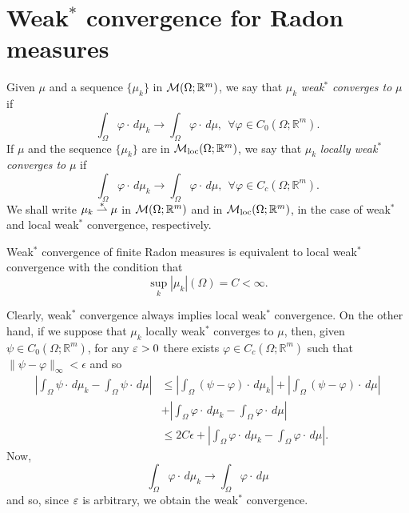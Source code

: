 \section{Weak$^{*}$ convergence for Radon measures}

\begin{definition} Given $\mu$ and a sequence $\{\mu_{k}\}$ in $\mathcal{M}(\Omega; \mathbb{R}^{m})$, we say that $\mu_{k}$ {\em weak$^{*}$ converges to} $\mu$ if
\[ \int_{\Omega} \varphi \cdot \, d\mu_{k} \to \int_{\Omega} \varphi \cdot \, d\mu, \    \   \forall \varphi \in C_{0}(\Omega; \mathbb{R}^{m}).   \]
If $\mu$ and the sequence $\{\mu_{k}\}$ are in $\mathcal{M}_{\rm loc}(\Omega; \mathbb{R}^{m})$, we say that $\mu_{k}$ {\em locally weak$^{*}$ converges to} $\mu$ if
\[ \int_{\Omega} \varphi \cdot \, d\mu_{k} \to \int_{\Omega} \varphi \cdot \, d\mu, \    \   \forall \varphi \in C_{c}(\Omega; \mathbb{R}^{m}).   \]
We shall write $\mu_{k} \overset{*}{\rightharpoonup} \mu$ in $\mathcal{M}(\Omega; \mathbb{R}^{m})$ and in $\mathcal{M}_{\rm loc}(\Omega; \mathbb{R}^{m})$, in the case of weak$^{*}$ and local weak$^{*}$ convergence, respectively.
\end{definition}

\begin{remark} \label{equivalenceweak-star} Weak$^{*}$ convergence of finite Radon measures is equivalent to local weak$^{*}$ convergence with the condition that $$\sup_{k} |\mu_{k}|(\Omega) = C < \infty.$$

Clearly, weak$^{*}$ convergence always implies local weak$^{*}$ convergence. 
On the other hand, if we suppose that $\mu_{k}$ locally weak$^{*}$ converges to $\mu$, then, given $\psi \in C_{0}(\Omega; \mathbb{R}^{m})$, for any $\varepsilon > 0$ there exists $\varphi \in C_{c}(\Omega; \mathbb{R}^{m})$ such that $\|\psi - \varphi\|_{\infty} < \epsilon$ and so
\begin{align*} \left | \int_{\Omega} \psi \cdot \, d\mu_{k} - \int_{\Omega} \psi \cdot \, d\mu \right | & \le \left | \int_{\Omega} (\psi - \varphi) \cdot \, d\mu_{k} \right | + \left | \int_{\Omega} (\psi - \varphi) \cdot \, d\mu \right | \\
& + \left | \int_{\Omega} \varphi \cdot \, d\mu_{k} - \int_{\Omega} \varphi \cdot \, d\mu \right | \\
& \le 2 C \epsilon + \left | \int_{\Omega} \varphi \cdot \, d\mu_{k} - \int_{\Omega} \varphi \cdot \, d\mu \right |.
\end{align*}
Now, $$\int_{\Omega} \varphi \cdot \, d\mu_{k} \to \int_{\Omega} \varphi \cdot \, d\mu$$ and so, since $\varepsilon$ is arbitrary, we obtain the weak$^{*}$ convergence.
\end{remark}

